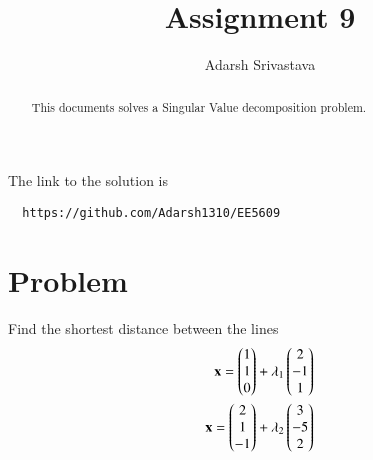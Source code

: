 \documentclass[journal,12pt,twocolumn]{IEEEtran}
\begin{document}
      \def\rightbox#1{\makebox[0in][r]{#1}}
      \def\centbox#1{\makebox[0in]{#1}}
      \def\topbox#1{\raisebox{-\baselineskip}[0in][0in]{#1}}
      \def\midbox#1{\raisebox{-0.5\baselineskip}[0in][0in]{#1}}
 \vspace{3cm}
 \title{Assignment 9}
 \author{Adarsh Srivastava}
 \maketitle
 \newpage
 \bigskip
 \renewcommand{\thetable}{\theenumi}
 The link to the solution is
 \begin{lstlisting}
  https://github.com/Adarsh1310/EE5609
 \end{lstlisting}
 \begin{abstract}
 This documents solves a Singular Value decomposition problem.
 \end{abstract}
  \section{\textbf{Problem}}
Find the shortest distance between the lines
\begin{align}
\mathbf{x}=\begin{pmatrix}1\\1\\0\end{pmatrix}+\lambda_1\begin{pmatrix}2\\-1\\1\end{pmatrix}\\
\mathbf{x}=\begin{pmatrix}2\\1\\-1\end{pmatrix}+\lambda_2\begin{pmatrix}3\\-5\\2\end{pmatrix}
\end{align}
\end{document}
